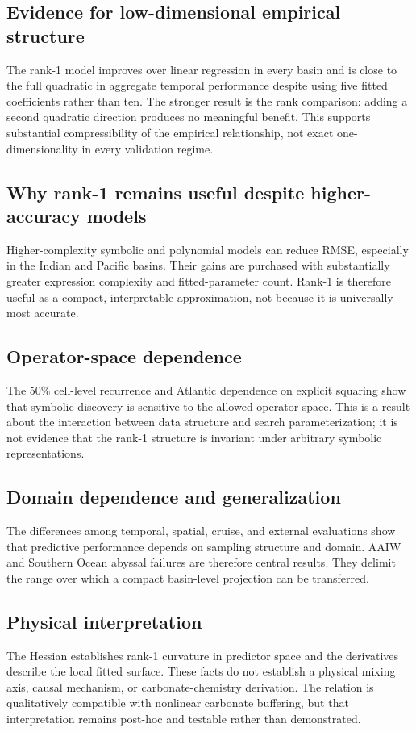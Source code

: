 \documentclass[12pt,a4paper]{article}
\begin{document}
\subsection{Evidence for low-dimensional empirical structure}
The rank-1 model improves over linear regression in every basin and is close to the full quadratic in aggregate temporal performance despite using five fitted coefficients rather than ten. The stronger result is the rank comparison: adding a second quadratic direction produces no meaningful benefit. This supports substantial compressibility of the empirical relationship, not exact one-dimensionality in every validation regime.

\subsection{Why rank-1 remains useful despite higher-accuracy models}
Higher-complexity symbolic and polynomial models can reduce RMSE, especially in the Indian and Pacific basins. Their gains are purchased with substantially greater expression complexity and fitted-parameter count. Rank-1 is therefore useful as a compact, interpretable approximation, not because it is universally most accurate.

\subsection{Operator-space dependence}
The 50\% cell-level recurrence and Atlantic dependence on explicit squaring show that symbolic discovery is sensitive to the allowed operator space. This is a result about the interaction between data structure and search parameterization; it is not evidence that the rank-1 structure is invariant under arbitrary symbolic representations.

\subsection{Domain dependence and generalization}
The differences among temporal, spatial, cruise, and external evaluations show that predictive performance depends on sampling structure and domain. AAIW and Southern Ocean abyssal failures are therefore central results. They delimit the range over which a compact basin-level projection can be transferred.

\subsection{Physical interpretation}
The Hessian establishes rank-1 curvature in predictor space and the derivatives describe the local fitted surface. These facts do not establish a physical mixing axis, causal mechanism, or carbonate-chemistry derivation. The relation is qualitatively compatible with nonlinear carbonate buffering, but that interpretation remains post-hoc and testable rather than demonstrated.
\end{document}
